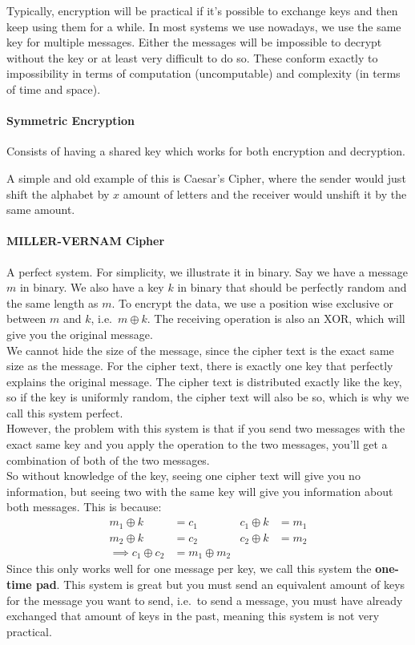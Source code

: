 \documentclass[12 pt]{article}
\begin{document}
Typically, encryption will be practical if it's possible to exchange
keys and then keep using them for a while. In most systems we use
nowadays, we use the same key for multiple messages. Either the
messages will be impossible to decrypt without the key or at least
very difficult to do so. These conform exactly to impossibility in
terms of computation (uncomputable) and complexity (in terms of time
and space).
\paragraph{Symmetric Encryption} Consists of having a shared key which
works for both encryption and decryption.

A simple and old example of this is Caesar's Cipher, where the sender
would just shift the alphabet by $x$ amount of letters and the
receiver would unshift it by the same amount.

\paragraph{MILLER-VERNAM Cipher} A perfect system. For simplicity, we
illustrate it in binary. Say we have a message $m$ in binary. We also
have a key $k$ in binary that should be perfectly random and the same
length as $m$. To encrypt
the data, we use a position wise exclusive or between $m$ and $k$,
i.e.\ $m \oplus k$. The receiving operation is also an XOR, which will
give you the original message.
\\ We cannot hide the size of the message, since the cipher text is
the exact same size as the message. For the cipher text, there is
exactly one key that perfectly explains the original message. The
cipher text is distributed exactly like the key, so if the key is
uniformly random, the cipher text will also be so, which is why we
call this system perfect.
\\ However, the problem with this system is that if you send two
messages with the exact same key and you apply the operation to the
two messages, you'll get a combination of both of the two messages.
\\ So without knowledge of the key, seeing one cipher text will give
you no information, but seeing two with the same key will give you
information about both messages. This is because:
\begin{align*}
  m_1 \oplus k &= c_1 & c_1 \oplus k & = m_1
  \\m_2 \oplus k &= c_2 & c_2 \oplus k & = m_2
  \\ \implies c_1 \oplus c_2 & = m_1 \oplus m_2
\end{align*}
Since this only works well for one
message per key, we call this system the \textbf{one-time pad}. This
system is great but you must send an equivalent amount of keys for the
message you want to send, i.e.\ to send a message, you must have
already exchanged that amount of keys in the past, meaning this system
is not very practical.
\end{document}
